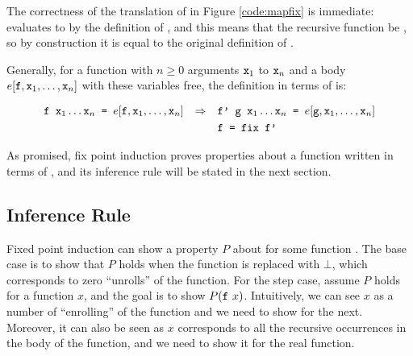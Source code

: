 The correctness of the translation of  in Figure
\ref{code:mapfix} is immediate:  evaluates to
 by the definition of , and this means
that the recursive function  be , so by
construction it is equal to the original definition of .

Generally, for a function  with $n \geq 0$ arguments $\hs{x}_1$
to $\hs{x}_n$ and a body $e[\hs{f},\hs{x}_1,\ldots,\hs{x}_n]$ with
these variables free, the definition in terms of  is:

\begin{align*}
& \hs{f } \hs{x}_1 \ldots \hs{x}_n \hs{ = } e[\hs{f},\hs{x}_1,\ldots,\hs{x}_n] & \Rightarrow &&& \hs{f' g } \hs{x}_1 \ldots \hs{x}_n \hs{ = } e[\hs{g},\hs{x}_1,\ldots,\hs{x}_n] \\
&                                                                     &             &&& \hs{f = fix f'}
\end{align*}


\begin{comment}
This translation needs to be carried out with some care, since for $f
\, \overline{x} = e(\overline{x},f)$, it is also possible that $f$ is
called in bodies of other functions. These are of two kinds: either
this function is also called from $f$, making it recursive, or another
function which is not called from $f$, but makes use of $f$
anyway. The first example, with a recursive call, the body needs to be
edited so $f$ becomes translated (to $\bot$, $\unfix{f}$ or
$\tofix{f}$), and the second case should use the original $f$. The
transitive closure of the call graph is calculated, and every
appropriate calls of $f$ are replaced.
\end{comment}

As promised, fix point induction proves properties about a function written in terms
of , and its inference rule will be stated in the next section.

\subsection{Inference Rule}

Fixed point induction can show a property $P$ about  for
some function . The base case is to show that $P$ holds when the
function is replaced with $\bot$, which corresponds to zero
``unrolls'' of the function. For the step case, assume $P$
holds for a function $x$, and the goal is to show $P(\hs{f} \w x)$.
Intuitively, we can see $x$ as a number of ``enrolling'' of the
function and we need to show for the next. Moreover, it can also be
seen as $x$ corresponds to all the recursive occurrences in the body of
the function, and we need to show it for the real function.

